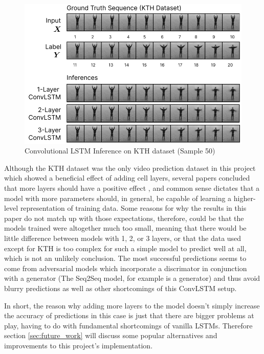 \documentclass{scrartcl}
\begin{document}
\begin{figure}[H]
	\begin{center}
		\includegraphics[width=1\textwidth]{inferences/kth/kth_inferences_2.png}
	\end{center}
	\caption{Convolutional LSTM Inference on KTH dataset (Sample 50)}
	\label{inf:lstm_kth_inference_2}
\end{figure}

Although the KTH dataset was the only video prediction dataset in this project
which showed a beneficial effect of adding cell layers, several papers
concluded that more layers should have a positive effect \cite{mmnist_dataset,
seq2seq_original}, and common sense dictates that a model with more parameters
should, in general, be capable of learning a higher-level representation of
training data. Some reasons for why the results in this paper do not match up
with those expectations, therefore, could be that the models trained were
altogether much too small, meaning that there would be little difference
between models with 1, 2, or 3 layers, or that the data used except for KTH is
too complex for such a simple model to predict well at all, which is not an
unlikely conclusion. The most successful predictions seems to come from
adversarial models which incorporate a discrimator in conjunction with a
generator (The Seq2Seq model, for example is a generator) and thus avoid blurry
predictions as well as other shortcomings of this ConvLSTM setup.

In short, the reason why adding more layers to the model doesn't simply
increase the accuracy of predictions in this case is just that there are bigger
problems at play, having to do with fundamental shortcomings of vanilla LSTMs.
Therefore section \ref{sec:future_work} will discuss some popular alternatives
and improvements to this project's implementation.
\end{document}

